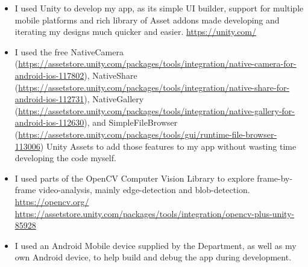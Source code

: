 \begin{itemize}
\item I used Unity to develop my app, as its simple UI builder, support for multiple mobile platforms and rich library of Asset addons made developing and iterating my designs much quicker and easier. \url{https://unity.com/}
\item I used the free NativeCamera (\url{https://assetstore.unity.com/packages/tools/integration/native-camera-for-android-ios-117802}), NativeShare (\url{https://assetstore.unity.com/packages/tools/integration/native-share-for-android-ios-112731}), NativeGallery (\url{https://assetstore.unity.com/packages/tools/integration/native-gallery-for-android-ios-112630}), and SimpleFileBrowser (\url{https://assetstore.unity.com/packages/tools/gui/runtime-file-browser-113006}) Unity Assets to add those features to my app without wasting time developing the code myself.
\item I used parts of the OpenCV Computer Vision Library to explore frame-by-frame video-analysis, mainly edge-detection and blob-detection.
\\\url{https://opencv.org/}
\\\url{https://assetstore.unity.com/packages/tools/integration/opencv-plus-unity-85928}
\item I used an Android Mobile device supplied by the Department, as well as my own Android device, to help build and debug the app during development.

\end{itemize}
